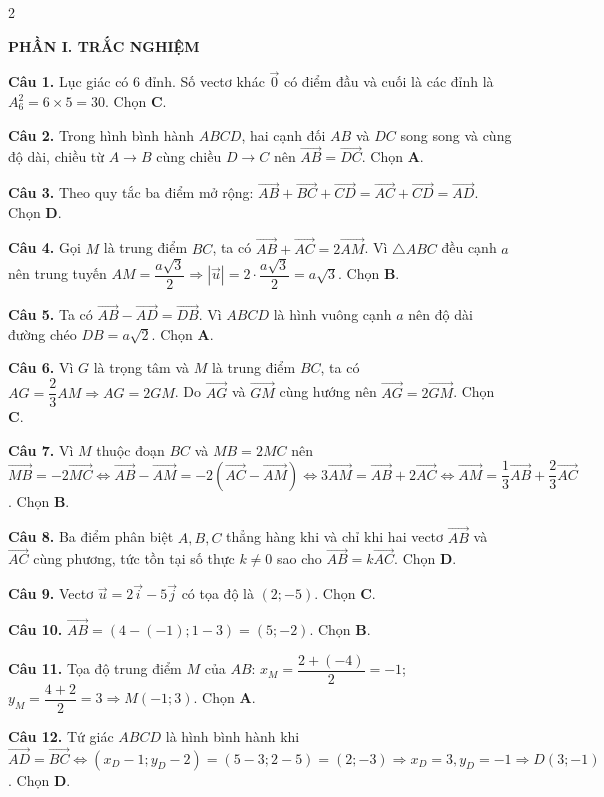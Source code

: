 \documentclass[10pt,a4paper]{article}
\begin{document}
\begin{multicols}{2}
\raggedcolumns
\small

\textbf{\color{accent}PHẦN I. TRẮC NGHIỆM}

\textbf{Câu 1.} Lục giác có $6$ đỉnh. Số vectơ khác $\vec{0}$ có điểm đầu và cuối là các đỉnh là $A_6^2 = 6 \times 5 = 30$. Chọn \textbf{C}.

\textbf{Câu 2.} Trong hình bình hành $ABCD$, hai cạnh đối $AB$ và $DC$ song song và cùng độ dài, chiều từ $A \to B$ cùng chiều $D \to C$ nên $\vec{AB} = \vec{DC}$. Chọn \textbf{A}.

\textbf{Câu 3.} Theo quy tắc ba điểm mở rộng: $\vec{AB} + \vec{BC} + \vec{CD} = \vec{AC} + \vec{CD} = \vec{AD}$. Chọn \textbf{D}.

\textbf{Câu 4.} Gọi $M$ là trung điểm $BC$, ta có $\vec{AB} + \vec{AC} = 2\vec{AM}$. Vì $\triangle ABC$ đều cạnh $a$ nên trung tuyến $AM = \dfrac{a\sqrt{3}}{2} \Rightarrow |\vec{u}| = 2 \cdot \dfrac{a\sqrt{3}}{2} = a\sqrt{3}$. Chọn \textbf{B}.

\textbf{Câu 5.} Ta có $\vec{AB} - \vec{AD} = \vec{DB}$. Vì $ABCD$ là hình vuông cạnh $a$ nên độ dài đường chéo $DB = a\sqrt{2}$. Chọn \textbf{A}.

\textbf{Câu 6.} Vì $G$ là trọng tâm và $M$ là trung điểm $BC$, ta có $AG = \dfrac{2}{3}AM \Rightarrow AG = 2GM$. Do $\vec{AG}$ và $\vec{GM}$ cùng hướng nên $\vec{AG} = 2\vec{GM}$. Chọn \textbf{C}.

\textbf{Câu 7.} Vì $M$ thuộc đoạn $BC$ và $MB = 2MC$ nên $\vec{MB} = -2\vec{MC} \Leftrightarrow \vec{AB} - \vec{AM} = -2(\vec{AC} - \vec{AM}) \Leftrightarrow 3\vec{AM} = \vec{AB} + 2\vec{AC} \Leftrightarrow \vec{AM} = \dfrac{1}{3}\vec{AB} + \dfrac{2}{3}\vec{AC}$. Chọn \textbf{B}.

\textbf{Câu 8.} Ba điểm phân biệt $A, B, C$ thẳng hàng khi và chỉ khi hai vectơ $\vec{AB}$ và $\vec{AC}$ cùng phương, tức tồn tại số thực $k \ne 0$ sao cho $\vec{AB} = k\vec{AC}$. Chọn \textbf{D}.

\textbf{Câu 9.} Vectơ $\vec{u} = 2\vec{i} - 5\vec{j}$ có tọa độ là $(2; -5)$. Chọn \textbf{C}.

\textbf{Câu 10.} $\vec{AB} = (4 - (-1); 1 - 3) = (5; -2)$. Chọn \textbf{B}.

\textbf{Câu 11.} Tọa độ trung điểm $M$ của $AB$: $x_M = \dfrac{2 + (-4)}{2} = -1$; $y_M = \dfrac{4 + 2}{2} = 3 \Rightarrow M(-1; 3)$. Chọn \textbf{A}.

\textbf{Câu 12.} Tứ giác $ABCD$ là hình bình hành khi $\vec{AD} = \vec{BC} \Leftrightarrow (x_D - 1; y_D - 2) = (5 - 3; 2 - 5) = (2; -3) \Rightarrow x_D = 3, y_D = -1 \Rightarrow D(3; -1)$. Chọn \textbf{D}.


\end{multicols}
\end{document}
